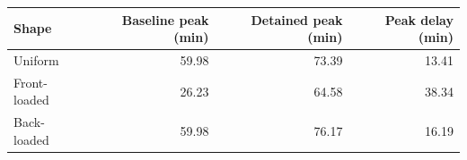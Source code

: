 \begin{tabular}{lrrr}
\toprule
Shape & Baseline peak (min) & Detained peak (min) & Peak delay (min) \\
\midrule
Uniform & 59.98 & 73.39 & 13.41 \\
Front-loaded & 26.23 & 64.58 & 38.34 \\
Back-loaded & 59.98 & 76.17 & 16.19 \\
\bottomrule
\end{tabular}
